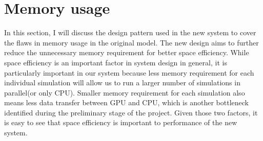 \documentclass[../thesis.tex]{subfiles}
\begin{document}
\chapter{Memory usage}
\label{ch:pruning}
In this section, I will discuss the design pattern used in the new system to cover the flaws in memory usage in the original model. The new design aims to further reduce the unnecessary memory requirement for better space efficiency. While space efficiency is an important factor in system design in general, it is particularly important in our system because less memory requirement for each individual simulation will allow us to run a larger number of simulations in parallel(or only CPU). Smaller memory requirement for each simulation also means less data transfer between GPU and CPU, which is another bottleneck identified during the preliminary stage of the project. Given those two factors, it is easy to see that space efficiency is important to performance of the new system.
\end{document}
